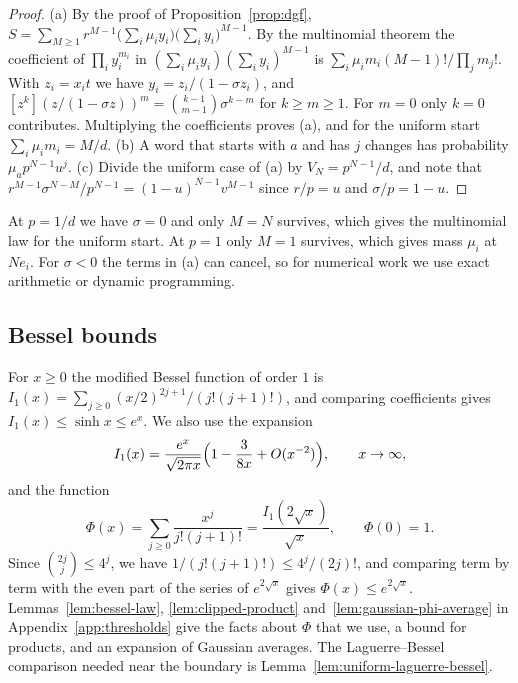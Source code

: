 \begin{proof}
(a) By the proof of Proposition~\ref{prop:dgf},
$S=\sum_{M\ge1}r^{M-1}\bigl(\sum_i\mu_iy_i\bigr)\bigl(\sum_iy_i\bigr)^{M-1}$. By the
multinomial theorem the coefficient of $\prod_iy_i^{m_i}$ in
$(\sum_i\mu_iy_i)(\sum_iy_i)^{M-1}$ is $\sum_i\mu_im_i(M-1)!/\prod_jm_j!$. With
$z_i=x_it$ we have $y_i=z_i/(1-\sigma z_i)$, and
$[z^k](z/(1-\sigma z))^m=\binom{k-1}{m-1}\sigma^{k-m}$ for $k\ge m\ge1$. For
$m=0$ only $k=0$ contributes. Multiplying the coefficients proves (a), and for
the uniform start $\sum_i\mu_im_i=M/d$.
(b) A word that starts with $a$ and has $j$ changes has probability
$\mu_ap^{N-1}u^j$.
(c) Divide the uniform case of (a) by $V_N=p^{N-1}/d$, and note that
$r^{M-1}\sigma^{N-M}/p^{N-1}=(1-u)^{N-1}v^{M-1}$ since $r/p=u$ and $\sigma/p=1-u$.
\end{proof}

At $p=1/d$ we have $\sigma=0$ and only $M=N$ survives, which gives the
multinomial law for the uniform start. At $p=1$ only $M=1$ survives, which gives
mass $\mu_i$ at $Ne_i$. For $\sigma<0$ the terms in (a) can cancel, so for
numerical work we use exact arithmetic or dynamic programming.

\subsection{Bessel bounds}

For $x\ge0$ the modified Bessel function of order $1$ is
$I_1(x)=\sum_{j\ge0}(x/2)^{2j+1}/(j!(j+1)!)$, and comparing coefficients gives
$I_1(x)\le\sinh x\le e^x$. We also use the expansion~\cite[Eq.~10.40.1]{dlmf}
\[
I_1(x)=\frac{e^x}{\sqrt{2\pi x}}\Bigl(1-\frac3{8x}+O(x^{-2})\Bigr),
\qquad x\to\infty,
\]
and the function
\[
\Phi(x)=\sum_{j\ge0}\frac{x^j}{j!(j+1)!}=\frac{I_1(2\sqrt x)}{\sqrt x},
\qquad\Phi(0)=1 .
\]
Since $\binom{2j}j\le4^j$, we have $1/(j!(j+1)!)\le4^j/(2j)!$, and comparing term
by term with the even part of the series of $e^{2\sqrt x}$ gives
$\Phi(x)\le e^{2\sqrt x}$. Lemmas~\ref{lem:bessel-law}, \ref{lem:clipped-product}
and~\ref{lem:gaussian-phi-average} in Appendix~\ref{app:thresholds} give the facts
about $\Phi$ that we use, a bound for products, and an expansion of Gaussian
averages. The Laguerre--Bessel comparison needed near the boundary is
Lemma~\ref{lem:uniform-laguerre-bessel}.
